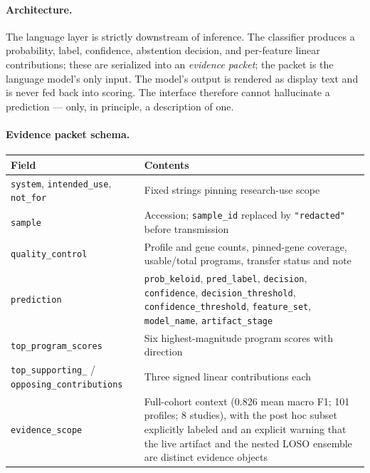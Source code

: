 \paragraph{Architecture.} The language layer is strictly downstream of
inference. The classifier produces a probability, label, confidence, abstention
decision, and per-feature linear contributions; these are serialized into an
\emph{evidence packet}; the packet is the language model's only input. The
model's output is rendered as display text and is never fed back into scoring.
The interface therefore cannot hallucinate a prediction --- only, in principle,
a description of one.

\paragraph{Evidence packet schema.}

{\small
\begin{tabular}{@{}lp{8.6cm}@{}}
\toprule
Field & Contents \\
\midrule
\texttt{system}, \texttt{intended\_use}, \texttt{not\_for} & Fixed strings pinning research-use scope \\
\texttt{sample} & Accession; \texttt{sample\_id} replaced by \texttt{"redacted"} before transmission \\
\texttt{quality\_control} & Profile and gene counts, pinned-gene coverage, usable/total programs, transfer status and note \\
\texttt{prediction} & \texttt{prob\_keloid}, \texttt{pred\_label}, \texttt{decision}, \texttt{confidence}, \texttt{decision\_threshold}, \texttt{confidence\_threshold}, \texttt{feature\_set}, \texttt{model\_name}, \texttt{artifact\_stage} \\
\texttt{top\_program\_scores} & Six highest-magnitude program scores with direction \\
\texttt{top\_supporting\_} / \texttt{opposing\_contributions} & Three signed linear contributions each \\
\texttt{evidence\_scope} & Full-cohort context (0.826 mean macro F1; 101 profiles; 8 studies), with the post hoc subset explicitly labeled and an explicit warning that the live artifact and the nested LOSO ensemble are distinct evidence objects \\
\bottomrule
\end{tabular}
}


